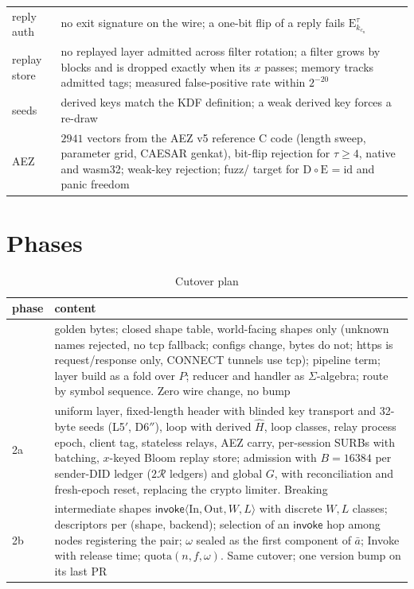 \documentclass[journal]{IEEEtran}
\newcommand{\Enc}[2]{\mathrm{E}^{#1}_{#2}}
\newcommand{\Dec}[2]{\mathrm{D}^{#1}_{#2}}
\newcommand{\quota}{\mathrm{quota}}
\newcommand{\In}{\mathrm{In}}
\newcommand{\Out}{\mathrm{Out}}
\newcommand{\Hm}{\hat H}
\DeclareRobustCommand{\code}[1]{{\ttfamily\renewcommand{\_}{\textunderscore\allowbreak}#1}}
\begin{document}
\begin{table}[t]
\begin{tabular}{@{}>{\raggedright\arraybackslash}p{}>{\raggedright\arraybackslash}p{}@{}}
reply auth & no exit signature on the wire; a one-bit flip of a reply fails $\Enc{\tau}{k_{c_n}}$ \\
replay store & no replayed layer admitted across filter rotation; a filter grows by blocks and is dropped exactly when its $x$ passes; memory tracks admitted tags; measured false-positive rate within $2^{-20}$ \\
seeds & derived keys match the KDF definition; a weak derived key forces a re-draw \\
AEZ & $2941$ vectors from the AEZ v5 reference C code (length sweep, parameter grid, CAESAR genkat), bit-flip rejection for $\tau\ge4$, native and \code{wasm32}; weak-key rejection; \code{fuzz/} target for $\Dec{}{}\circ\Enc{}{}=\mathrm{id}$ and panic freedom \\
\bottomrule
\end{tabular}
\end{table}

\section{Phases}\label{sec:phases}

\begin{table}[t]
\caption{Cutover plan}
\label{tab:phases}
\centering\small
\begin{tabular}{@{}>{\raggedright\arraybackslash}p{}>{\raggedright\arraybackslash}p{}@{}}
\toprule
phase & content \\
\midrule
1 & golden bytes; closed shape table, world-facing shapes only (unknown names rejected, no \code{tcp} fallback; configs change, bytes do not; \code{https} is request/response only, CONNECT tunnels use \code{tcp}); pipeline term; layer build as a fold over $P$; reducer and handler as $\Sigma$-algebra; route by symbol sequence.  Zero wire change, no bump \\
2a & uniform layer, fixed-length header with blinded key transport and 32-byte seeds (L5$'$, D6$''$), loop with derived $\Hm$, loop classes, relay process epoch, client tag, stateless relays, AEZ carry, per-session SURBs with batching, $x$-keyed Bloom replay store; admission with $B=16384$ per sender-DID ledger ($2\mathcal R$ ledgers) and global $G$, with reconciliation and fresh-epoch reset, replacing the crypto limiter.  Breaking \\
2b & intermediate shapes $\mathsf{invoke}\langle\In,\Out,W,L\rangle$ with discrete $W,L$ classes; descriptors per (shape, backend); selection of an $\mathsf{invoke}$ hop among nodes registering the pair; $\omega$ sealed as the first component of $\bar a$; \code{Invoke} with release time; $\quota(n,f,\omega)$.  Same cutover; one version bump on its last PR \\
\bottomrule
\end{tabular}
\end{table}
\end{document}
